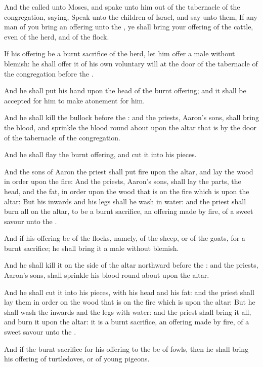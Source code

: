 \Chapter
\Verse And the \LORD called unto Moses, and spake unto him out of the tabernacle of the congregation, saying, \Verse Speak unto the children of Israel, and say unto them, If any man of you bring an offering unto the \LORD, ye shall bring your offering of the cattle, even of the herd, and of the flock.

\Verse If his offering be a burnt sacrifice of the herd, let him offer a male without blemish: he shall offer it of his own voluntary will at the door of the tabernacle of the congregation before the \LORD.

\Verse And he shall put his hand upon the head of the burnt offering; and it shall be accepted for him to make atonement for him.

\Verse And he shall kill the bullock before the \LORD: and the priests, Aaron's sons, shall bring the blood, and sprinkle the blood round about upon the altar that is by the door of the tabernacle of the congregation.

\Verse And he shall flay the burnt offering, and cut it into his pieces.

\Verse And the sons of Aaron the priest shall put fire upon the altar, and lay the wood in order upon the fire: \Verse And the priests, Aaron's sons, shall lay the parts, the head, and the fat, in order upon the wood that is on the fire which is upon the altar: \Verse But his inwards and his legs shall he wash in water: and the priest shall burn all on the altar, to be a burnt sacrifice, an offering made by fire, of a sweet savour unto the \LORD.

\Verse And if his offering be of the flocks, namely, of the sheep, or of the goats, for a burnt sacrifice; he shall bring it a male without blemish.

\Verse And he shall kill it on the side of the altar northward before the \LORD: and the priests, Aaron's sons, shall sprinkle his blood round about upon the altar.

\Verse And he shall cut it into his pieces, with his head and his fat: and the priest shall lay them in order on the wood that is on the fire which is upon the altar: \Verse But he shall wash the inwards and the legs with water: and the priest shall bring it all, and burn it upon the altar: it is a burnt sacrifice, an offering made by fire, of a sweet savour unto the \LORD.

\Verse And if the burnt sacrifice for his offering to the \LORD be of fowls, then he shall bring his offering of turtledoves, or of young pigeons.

